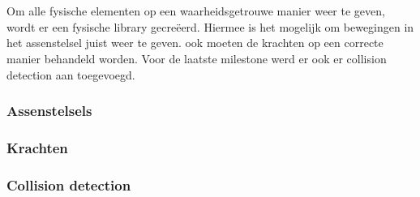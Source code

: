 \\
\\
Om alle fysische elementen op een waarheidsgetrouwe manier weer te geven, wordt er een fysische library gecre\"eerd. Hiermee is het mogelijk om bewegingen in het assenstelsel juist weer te geven. ook moeten de krachten op een correcte manier behandeld worden. Voor de laatste milestone werd er ook er collision detection aan toegevoegd. 
\subsubsection{Assenstelsels}
\label{subsec: Assenstelsels}


\subsubsection{Krachten}
\label{subsec: Krachten}


\subsubsection{Collision detection}
\label{subsec: Collision detection}

